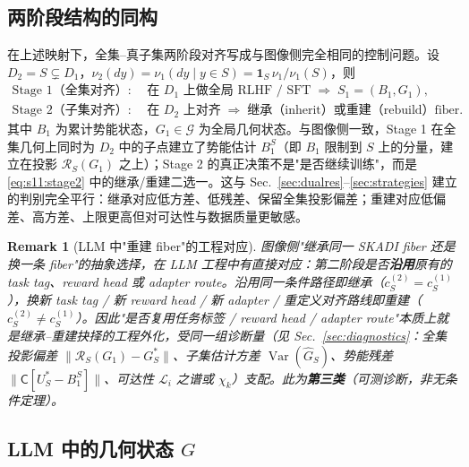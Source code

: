 \documentclass[11pt,a4paper]{article}
\newtheorem{remark}[theorem]{Remark}
\DeclareMathOperator{\Var}{Var}
\newcommand{\cL}{\mathcal{L}}   %
\newcommand{\cG}{\mathcal{G}}   %
\newcommand{\Rstr}{\mathcal{R}}     %
\newcommand{\Center}{\mathsf{C}}    %
\begin{document}
\subsection{两阶段结构的同构}

在上述映射下，全集--真子集两阶段对齐写成与图像侧完全相同的控制问题。设 $D_2=S\subsetneq D_1$，$\nu_2(dy)=\nu_1(dy\mid y\in S)=\mathbf{1}_S\,\nu_1/\nu_1(S)$，则
\begin{align}
\text{Stage 1（全集对齐）:}\quad & \text{在 } D_1 \text{ 上做全局 RLHF / SFT}\;\Rightarrow\; S_1=(B_1,G_1), \label{eq:s11:stage1}\\
\text{Stage 2（子集对齐）:}\quad & \text{在 } D_2 \text{ 上对齐}\;\Rightarrow\; \text{继承（inherit）或重建（rebuild）fiber}. \label{eq:s11:stage2}
\end{align}
其中 $B_1$ 为累计势能状态，$G_1\in\cG$ 为全局几何状态。与图像侧一致，Stage 1 在全集几何上同时为 $D_2$ 中的子点建立了势能估计 $B_1^S$（即 $B_1$ 限制到 $S$ 上的分量，建立在投影 $\Rstr_S(G_1)$ 之上）；Stage 2 的真正决策不是"是否继续训练"，而是 \eqref{eq:s11:stage2} 中的继承/重建二选一。这与 Sec.~\ref{sec:dualres}--\ref{sec:strategies} 建立的判别完全平行：继承对应低方差、低残差、保留全集投影偏差；重建对应低偏差、高方差、上限更高但对可达性与数据质量更敏感。

\begin{remark}[LLM 中"重建 fiber"的工程对应]\label{rem:s11:engineering}
图像侧"继承同一 SKADI fiber 还是换一条 fiber"的抽象选择，在 LLM 工程中有直接对应：第二阶段是否\textbf{沿用}原有的 task tag、reward head 或 adapter route。沿用同一条件路径即继承（$c_S^{(2)}=c_S^{(1)}$），换新 task tag / 新 reward head / 新 adapter / 重定义对齐路线即重建（$c_S^{(2)}\neq c_S^{(1)}$）。因此"是否复用任务标签 / reward head / adapter route"本质上\emph{就是}继承--重建抉择的工程外化，受同一组诊断量（见 Sec.~\ref{sec:diagnostics}：全集投影偏差 $\|\Rstr_S(G_1)-G_S^*\|$、子集估计方差 $\Var(\widehat G_S)$、势能残差 $\|\Center[U_S^*-B_1^S]\|$、可达性 $\cL_i$ 之谱或 $\chi_k$）支配。此为\textbf{第三类}（可测诊断，非无条件定理）。
\end{remark}

\subsection{LLM 中的几何状态 $G$}
\end{document}
